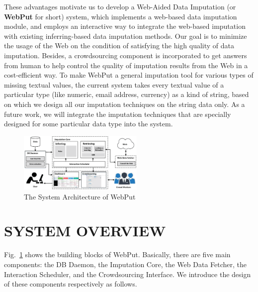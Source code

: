 \documentclass[sigconf]{acmart}
\begin{document}
These advantages motivate us to develop a Web-Aided Data Imputation (or {\bf WebPut} for short) system, which implements a web-based data imputation module, and employs an interactive way to integrate the web-based imputation with existing inferring-based data imputation methods. Our goal is to minimize the usage of the Web on the condition of satisfying the high quality of data imputation. Besides, a crowdsourcing component is incorporated to get answers from human to help control the quality of imputation results from the Web in a cost-efficient way.
%
To make WebPut a general imputation tool for various types of missing textual values, the current system takes every textual value of a particular type (like numeric, email address, currency) as a kind of string, based on which we design all our imputation techniques on the string data only. As a future work, we will integrate the imputation techniques that are specially designed for some particular data type into the system.


%

\begin{figure}
  \centerline{\includegraphics[width=6cm]{images/Architecture.eps}}
  \caption {\small  The System Architecture of WebPut}
  \label{fig:architecture}
\end{figure}


\vspace{-10pt}
\section{SYSTEM  OVERVIEW}
Fig.~\ref{fig:architecture} shows the building blocks of WebPut. Basically, there are  five main components: the DB Daemon, the Imputation Core, the Web Data Fetcher, the Interaction Scheduler, and the Crowdsourcing Interface. We introduce the design of these components respectively as follows.
\end{document}
